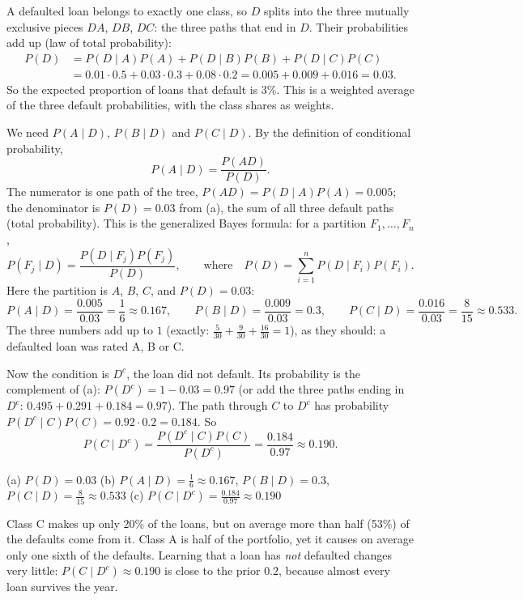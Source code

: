 \begin{solution}
	 A defaulted loan belongs to exactly one class, so $D$ splits
	into the three mutually exclusive pieces $DA$, $DB$, $DC$: the three paths
	that end in $D$. Their probabilities add up (law of total probability):
	\[ \begin{aligned}
			P(D) & =P(D\mid A)P(A)+P(D\mid B)P(B)+P(D\mid C)P(C) \\
			     & =0.01\cdot0.5+0.03\cdot0.3+0.08\cdot0.2
			=0.005+0.009+0.016=0.03.
		\end{aligned} \]
	So the expected proportion of loans that default is 3\%. This is a weighted average of the three
	default probabilities, with the class shares as weights.

	 We need $P(A\mid D)$, $P(B\mid D)$ and $P(C\mid D)$. By the
	definition of conditional probability,
	\[ P(A\mid D)=\frac{P(AD)}{P(D)}. \]
	The numerator is one path of the tree, $P(AD)=P(D\mid A)P(A)=0.005$; the
	denominator is $P(D)=0.03$ from (a), the sum of all three default paths
	(total probability). This is the generalized Bayes formula: for a
	partition $F_1,\dots,F_n$,
	\[ P(F_j\mid D)=\frac{P(D\mid F_j)P(F_j)}{P(D)},\qquad
		\text{where}\quad P(D)=\sum_{i=1}^{n}P(D\mid F_i)P(F_i). \]
	Here the partition is $A$, $B$, $C$, and $P(D)=0.03$:
	\[ P(A\mid D)=\frac{0.005}{0.03}=\frac16\approx0.167,\qquad
		P(B\mid D)=\frac{0.009}{0.03}=0.3,\qquad
		P(C\mid D)=\frac{0.016}{0.03}=\frac{8}{15}\approx0.533. \]
	The three numbers add up to $1$ (exactly: $\frac{5}{30}+\frac{9}{30}+
		\frac{16}{30}=1$), as they should: a defaulted loan was rated A, B or C.

	 Now the condition is $D^c$, the loan did not default. Its
	probability is the complement of (a): $P(D^c)=1-0.03=0.97$ (or add the
	three paths ending in $D^c$: $0.495+0.291+0.184=0.97$). The path through
	$C$ to $D^c$ has probability $P(D^c\mid C)P(C)=0.92\cdot0.2=0.184$. So
	\[ P(C\mid D^c)=\frac{P(D^c\mid C)P(C)}{P(D^c)}=\frac{0.184}{0.97}
		\approx0.190. \]
	\begin{answer}
		(a) $P(D)=0.03$ \quad (b) $P(A\mid D)=\frac16\approx0.167$,
		$P(B\mid D)=0.3$, $P(C\mid D)=\frac{8}{15}\approx0.533$ \quad
		(c) $P(C\mid D^c)=\frac{0.184}{0.97}\approx0.190$
	\end{answer}
	\begin{remark}
		Class C makes up only 20\% of the loans, but on average more than half
		(53\%) of the defaults come from it. Class A is half of the portfolio,
		yet it causes on average only one sixth of the defaults. Learning that a loan has \emph{not}
		defaulted changes very little: $P(C\mid D^c)\approx0.190$ is close to
		the prior $0.2$, because almost every loan survives the year.
	\end{remark}
\end{solution}
